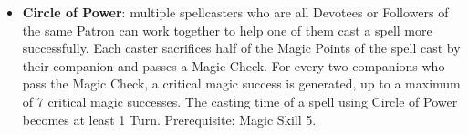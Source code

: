 \documentclass[landscape,10pt,a4paper]{article}
\begin{document}
\begin{multicols}{2}
\begin{dmbox}[title=Alter Magic - page \pageref{altering spells}]
\begin{itemize}[leftmargin=0.5cm,itemsep=-1pt,parsep=0pt]
\item \textbf{Circle of Power}: multiple spellcasters who are all Devotees or Followers of the same Patron can work together to help one of them cast a spell more successfully.
Each caster sacrifices half of the Magic Points of the spell cast by their companion and passes a Magic Check. For every two companions who pass the Magic Check, a critical magic success is generated, up to a maximum of 7 critical magic successes. The casting time of a spell using Circle of Power becomes at least 1 Turn. Prerequisite: Magic Skill 5.

\end{itemize}
\end{dmbox}



\end{multicols}
\end{document}
